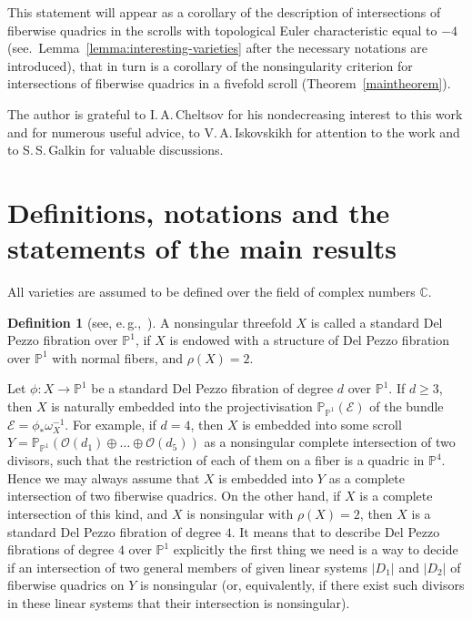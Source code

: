 \documentclass[12pt]{amsart}
\theoremstyle{definition}
\newtheorem{definition}[equation]{Definition}
\theoremstyle{remark}
\begin{document}
This statement will appear as a corollary of the description of intersections
of fiberwise quadrics in the scrolls
with topological Euler characteristic equal to $-4$ 
(see.~Lemma~\ref{lemma:interesting-varieties} after the necessary notations are
introduced), that in turn is a corollary of the nonsingularity criterion for
intersections of fiberwise quadrics in a fivefold scroll 
(Theorem~\ref{maintheorem}).

\smallskip
The author is grateful to I.\,A.\,Cheltsov for his nondecreasing interest 
to this work and for numerous useful advice, to V.\,A.\,Iskovskikh for 
attention to the work and to S.\,S.\,Galkin for valuable discussions.


\section{Definitions, notations and the statements of the main results}
\label{setup}

All varieties are assumed to be defined over the field of complex numbers 
${\mathbb{C}}$.

\begin{definition}[see, e.\,g.,~\cite{Alexeev}]
A nonsingular threefold $X$ is called a standard Del Pezzo fibration over 
$\mathbb{P}^1$, if $X$ is endowed with a structure of Del Pezzo 
fibration over $\mathbb{P}^1$ with normal fibers, and $\rho(X)=2$.
\end{definition}

Let $\phi:X\to\mathbb{P}^1$ be a standard Del Pezzo fibration of degree $d$ 
over $\mathbb{P}^1$. If $d\geqslant 3$, then  
$X$ is naturally embedded into the projectivisation  
${\mathbb{P}}_{\mathbb{P}^1}({\mathcal{E}})$ of the bundle 
${\mathcal{E}}=\phi_*\omega_X^{-1}$.
For example, if $d=4$, then $X$ is embedded into some scroll 
$Y={\mathbb{P}}_{{\mathbb{P}}^1}({\mathcal{O}}(d_1)\oplus\ldots\oplus{\mathcal{O}}(d_5))$
as a nonsingular complete intersection of two divisors, 
such that the restriction of each of them on a fiber is a quadric in 
${\mathbb{P}}^4$. 
Hence we may always assume that  $X$ is embedded into $Y$ 
as a complete intersection of two fiberwise quadrics.
On the other hand, if $X$ is a complete intersection of this kind, and 
$X$ is nonsingular with $\rho(X)=2$, then $X$ is a standard Del Pezzo 
fibration of degree $4$. It means that to describe Del Pezzo fibrations
of degree $4$ over ${\mathbb{P}}^1$ explicitly the first thing we need
is a way to decide if an intersection of two general members
of given linear systems $|D_1|$ and $|D_2|$ of fiberwise quadrics on $Y$ 
is nonsingular (or, equivalently, if there exist such divisors in these 
linear systems that their intersection is nonsingular).
\end{document}
